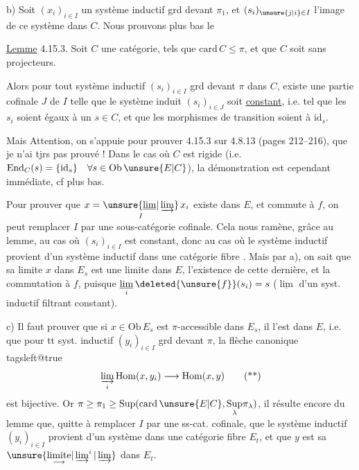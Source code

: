 b) Soit $(x_i)_{i\in I}$ un système inductif grd devant $\pi_1$, et $(s_i)_{\unsure{j|i}\in I}$ l'image de ce système dans $C$.  Nous prouvons plus bas le

\uline{Lemme} 4.15.3. Soit $C$ une catégorie,  tels que $\mathrm{card}\,C\leq\pi$, et que $C$ soit sans projecteurs.

Alors pour tout système inductif $(s_i)_{i\in I}$ grd devant $\pi$ dans $C$, existe une partie cofinale  $J$ de $I$ telle que  le système induit $(s_i)_{i\in J}$ soit \uline{constant}, i.e. tel que les $s_i$ soient égaux à un $s\in C$, et que les morphismes de transition soient    à $\mathrm{id}_s$.

\margin{Sous \unsure{réserve|réserves} de la validité du \unsure{corollaire|coroll.} de 4.8.13. Mais c'est à présent établi, sous une \unsure{forme|hyp.} \unsure{suffisante|plus suffisante|moins restrictive}, \unsure{cf.} \unsure{4.15.6 a) 1°]|4.15.6 a) 1°|4.15.6 a)}}

Mais Attention, on s'appuie pour prouver 4.15.3 sur  4.8.13 (pages 212--216), que je n'ai tjrs pas prouvé ! Dans le cas où $C$ est rigide (i.e. $\mathrm{End}_C(s)=\{\mathrm{id}_s\}\quad\forall s\in\mathrm{Ob}\,\unsure{E|C}$), la démonstration est cependant immédiate, cf plus bas.

Pour prouver que $x=\underset I{\unsure{\underline{\lim}|\varinjlim}}\,x_i$ existe dans $E$, et commute à $f$, on peut remplacer $I$ par une sous-catégorie cofinale. Cela nous ramène, grâce au lemme, au cas où $(s_i)_{i\in I}$ est constant, donc au cas où le système inductif provient d'un système inductif dans une catégorie fibre . Mais par a), on sait que sa limite $x$ dans $E_s$ est une limite dans $E$,  l'existence de cette dernière, et la commutation à $f$, puisque $\underset i{\underline{\lim}}\,\deleted{\unsure{f}}(s_i)=s$ ($\underline{\lim}$ d'un syst. inductif filtrant constant).

c) Il faut prouver que si $x\in\mathrm{Ob}\,E_s$ est $\pi$-accessible  dans $E_s$, il l'est dans $E$, i.e. que pour tt syst. inductif $(y_i)_{i\in I}$ grd devant $\pi$, la flèche canonique
{\csname tagsleft@true\endcsname
\[\varinjlim_i\mathrm{Hom}(x,y_i)\longrightarrow\mathrm{Hom}(x,y)\tag*{(**)}\]}
est bijective. Or   $\pi\geq\pi_1\geq\mathrm{Sup}(\mathrm{card}\,\unsure{E|C},\underset{\lambda}{\mathrm{Sup}}\pi_\lambda)$, il résulte encore du lemme que, quitte à remplacer $I$ par une ss-cat. cofinale,  que le système inductif $(y_i)_{i\in I}$ provient d'un système dans  une catégorie fibre $E_t$, et que $y$ est sa $\unsure{\underset{\longrightarrow}{\mathrm{limite}}|\varinjlim^{i}|\varinjlim}$ dans $E_t$.


